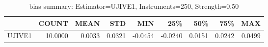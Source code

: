\begin{table}[ht]
\centering
\caption{bias summary: Estimator=UJIVE1, Instruments=250, Strength=0.50}
\begin{tabular}{lrrrrrrrr}
\toprule
 & COUNT & MEAN & STD & MIN & 25\% & 50\% & 75\% & MAX \\
\midrule
UJIVE1 & 10.0000 & 0.0033 & 0.0321 & -0.0454 & -0.0240 & 0.0151 & 0.0242 & 0.0499 \\
\bottomrule
\end{tabular}
\end{table}

